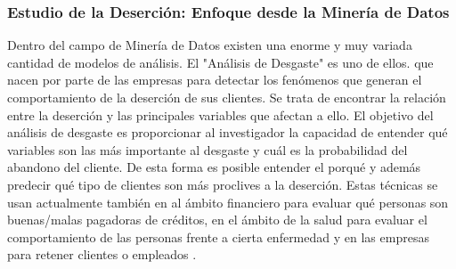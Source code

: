\subsubsection{Estudio de la Deserción: Enfoque desde la Minería de Datos }\label{seccion:dm_en_desercion}
Dentro del campo de Minería de Datos existen una enorme y muy variada cantidad de modelos de análisis. El "Análisis de Desgaste" es uno de ellos. que nacen por parte de las empresas para detectar los fenómenos que generan el comportamiento de la deserción de sus clientes. Se trata de encontrar la relación entre la deserción y las principales variables que afectan a ello. El objetivo del análisis de desgaste es proporcionar al investigador la capacidad de entender qué variables son las más importante al desgaste y cuál es la probabilidad del abandono del cliente. De esta forma es posible entender el porqué y además predecir qué tipo de clientes son más proclives a la deserción. Estas técnicas se usan actualmente también en al ámbito financiero para evaluar qué personas son buenas/malas pagadoras de créditos, en el ámbito de la salud para evaluar el comportamiento de las personas frente a cierta enfermedad y en las empresas para retener clientes o empleados \cite{Chapman1982AttritionAnalysis}.

